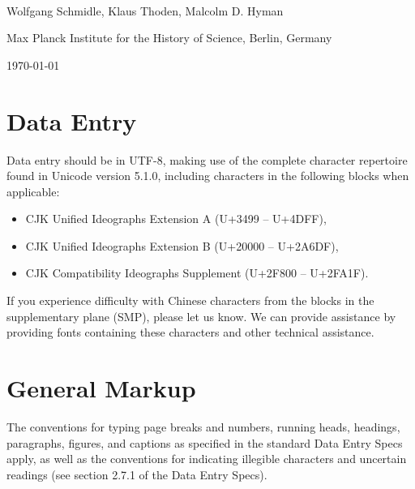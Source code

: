 \documentclass[fontsize=11pt, paper=a4, 
DIV15,
normalheadings,
parskip=half-, 
pointlessnumbers]{scrartcl}
\begin{document}
\begin{center}
{} \\[5mm]
\large Wolfgang Schmidle, Klaus Thoden, Malcolm D. Hyman

\normalsize Max Planck Institute for the History of Science, Berlin, Germany

\today
\end{center}


\section{Data Entry}

Data entry should be in UTF-8, making use of the complete character repertoire found in Unicode version 5.1.0, including characters in the following blocks when applicable: 

\begin{itemize}
\item CJK Unified Ideographs Extension A (U+3499 -- U+4DFF), 
\item CJK Unified Ideographs Extension B (U+20000 -- U+2A6DF), 
\item CJK Compatibility Ideographs Supplement (U+2F800 -- U+2FA1F). 
\end{itemize}

If you experience difficulty with Chinese characters from the blocks in the supplementary plane (SMP), please let us know. We can provide assistance by providing fonts containing these characters and other technical assistance.

\section{General Markup}

The conventions for typing page breaks and numbers, running heads, headings, paragraphs, figures, and captions as specified in the standard Data Entry Specs apply,
as well as the conventions for indicating illegible characters and uncertain readings (see section 2.7.1 of the Data Entry Specs). 
\end{document}
